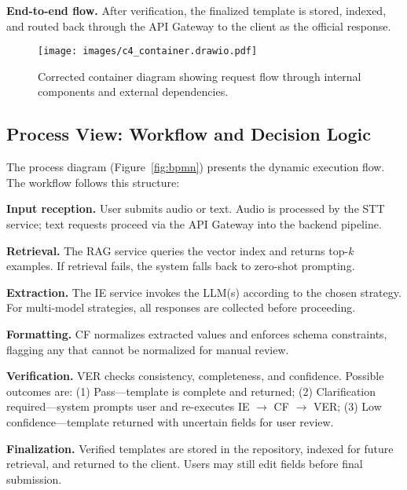 \textbf{End-to-end flow.} After verification, the finalized template is stored, indexed, and routed back through the API Gateway to the client as the official response.

\begin{figure}[H]
  \centering
  \texttt{[image: images/c4\_container.drawio.pdf]}
  \caption{Corrected container diagram showing request flow through internal components and external dependencies.}
  \label{fig:c4-container}
\end{figure}

\subsection{Process View: Workflow and Decision Logic}
\label{subsec:process-view}

The process diagram (Figure~\ref{fig:bpmn}) presents the dynamic execution flow. The workflow follows this structure:

\textbf{Input reception.} User submits audio or text. Audio is processed by the STT service; text requests proceed via the API Gateway into the backend pipeline.

\textbf{Retrieval.} The RAG service queries the vector index and returns top-$k$ examples. If retrieval fails, the system falls back to zero-shot prompting.

\textbf{Extraction.} The IE service invokes the LLM(s) according to the chosen strategy. For multi-model strategies, all responses are collected before proceeding.

\textbf{Formatting.} CF normalizes extracted values and enforces schema constraints, flagging any that cannot be normalized for manual review.

\textbf{Verification.} VER checks consistency, completeness, and confidence. Possible outcomes are: (1) Pass—template is complete and returned; (2) Clarification required—system prompts user and re-executes IE $\rightarrow$ CF $\rightarrow$ VER; (3) Low confidence—template returned with uncertain fields for user review.

\textbf{Finalization.} Verified templates are stored in the repository, indexed for future retrieval, and returned to the client. Users may still edit fields before final submission.

